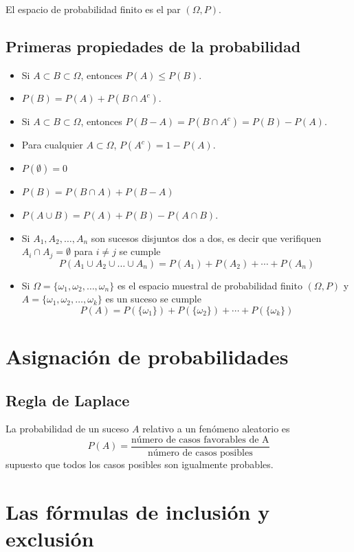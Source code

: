 \documentclass[12pt,a4paper,twoside]{memoir}
\theoremstyle{mystyle}
\begin{document}
El espacio de probabilidad finito es el par \((\Omega,P)\). 

\section{Primeras propiedades de la probabilidad} 

\begin{itemize}
  \item Si \(A \subset B \subset \Omega\), entonces \(P(A) \leq P(B)\).
  \item \(P(B) = P(A) + P(B \cap A^c)\).
  \item Si \(A \subset B \subset \Omega\), entonces \(P(B - A) = P(B \cap A^c) = P(B)- P(A)\). 
  \item Para cualquier \(A \subset \Omega\), \(P(A^c) = 1 - P(A)\). 
  \item \(P(\emptyset) = 0\)
  \item \(P(B) = P(B \cap A) + P(B - A)\)
  \item \(P(A \cup B) = P(A) + P(B) - P(A \cap B)\). 
  \item Si \(A_1, A_2,\ldots,A_n\) son sucesos disjuntos dos a dos, es decir que verifiquen \(A_i \cap A_j = \emptyset\) para \(i \neq j\) se cumple
  \[
  P(A_1 \cup A_2 \cup \ldots \cup A_n) = P(A_1) + P(A_2) + \cdots + P(A_n)
  \]
  \item Si \(\Omega = \{\omega_1, \omega_2, \ldots, \omega_n \}\) es el espacio muestral de probabilidad finito \((\Omega, P)\) y \(A = \{\omega_1, \omega_2, \ldots, \omega_k\}\) es un suceso se cumple
  \[
  P(A) = P(\{\omega_1\}) + P(\{\omega_2\}) + \cdots + P(\{\omega_k\})
  \]
\end{itemize}


\chapter{Asignación de probabilidades}

\section{Regla de Laplace} 

La probabilidad de un suceso \(A\) relativo a un fenómeno aleatorio es 
\[
  P(A) = \frac{\text{número de casos favorables de A}}{\text{número de casos posibles}}
\] 
supuesto que todos los casos posibles son igualmente probables.

\chapter{Las fórmulas de inclusión y exclusión}
\end{document}
